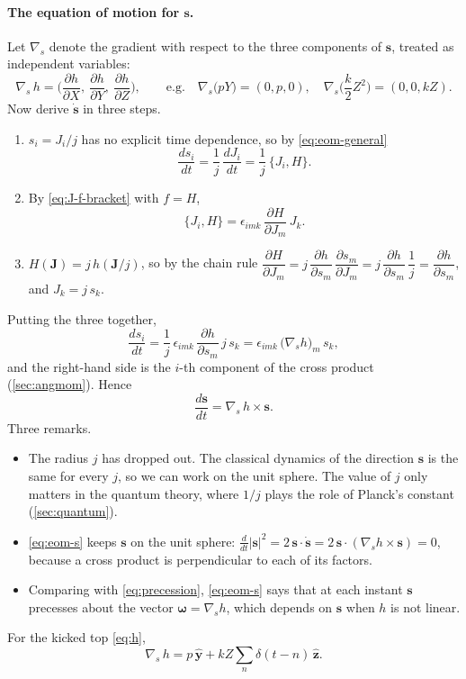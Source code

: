 \documentclass[11pt,a4paper]{article}
\newcommand{\vs}{\bm{s}}
\newcommand{\vJ}{\bm{J}}
\newcommand{\PB}[2]{\{#1,#2\}}
\begin{document}
\paragraph{The equation of motion for $\vs$.} Let $\nabla_{\!s}$ denote the gradient with respect to the three
components of $\vs$, treated as independent variables:
\begin{equation*}
  \nabla_{\!s}\, h = \Big(\frac{\partial h}{\partial X},\ \frac{\partial h}{\partial Y},\ \frac{\partial h}{\partial Z}\Big),
  \qquad\text{e.g.}\quad \nabla_{\!s}\big(pY\big) = (0, p, 0),\quad \nabla_{\!s}\Big(\frac k2 Z^2\Big) = (0, 0, kZ).
\end{equation*}
Now derive $\dot{\vs}$ in three steps.
\begin{enumerate}
  \item $s_i = J_i/j$ has no explicit time dependence, so by \eqref{eq:eom-general}
  \[ \frac{ds_i}{dt} = \frac1j\,\frac{dJ_i}{dt} = \frac1j\,\PB{J_i}{H}. \]
  \item By \eqref{eq:J-f-bracket} with $f = H$,
  \[ \PB{J_i}{H} = \epsilon_{imk}\,\frac{\partial H}{\partial J_m}\,J_k . \]
  \item $H(\vJ) = j\,h(\vJ/j)$, so by the chain rule $\dfrac{\partial H}{\partial J_m} = j\,\dfrac{\partial h}{\partial
  s_m}\,\dfrac{\partial s_m}{\partial J_m} = j\,\dfrac{\partial h}{\partial s_m}\,\dfrac1j = \dfrac{\partial h}{\partial
  s_m}$, and $J_k = j\,s_k$.
\end{enumerate}
Putting the three together,
\begin{equation*}
  \frac{ds_i}{dt} = \frac1j\,\epsilon_{imk}\,\frac{\partial h}{\partial s_m}\, j\,s_k
                 = \epsilon_{imk}\,\big(\nabla_{\!s} h\big)_m\, s_k ,
\end{equation*}
and the right-hand side is the $i$-th component of the cross product (\cref{sec:angmom}). Hence
\begin{equation}\label{eq:eom-s}
  \boxed{\frac{d\vs}{dt} = \nabla_{\!s}\, h \times \vs .}
\end{equation}
Three remarks.
\begin{itemize}
  \item The radius $j$ has dropped out. The classical dynamics of the direction $\vs$ is the same for every $j$, so we
  can work on the unit sphere. The value of $j$ only matters in the quantum theory, where $1/j$ plays the role of
  Planck's constant (\cref{sec:quantum}).
  \item \eqref{eq:eom-s} keeps $\vs$ on the unit sphere: $\frac{d}{dt}|\vs|^2 = 2\,\vs\cdot\dot{\vs} = 2\,\vs\cdot
  (\nabla_{\!s} h\times\vs) = 0$, because a cross product is perpendicular to each of its factors.
  \item Comparing with \eqref{eq:precession}, \eqref{eq:eom-s} says that at each instant $\vs$ precesses about the
  vector $\bm\omega = \nabla_{\!s} h$, which depends on $\vs$ when $h$ is not linear.
\end{itemize}
For the kicked top \eqref{eq:h},
\begin{equation}\label{eq:grad-h}
  \nabla_{\!s}\, h = p\,\hat{\bm y} + kZ\sum_n \delta(t-n)\,\hat{\bm z} .
\end{equation}
\end{document}
